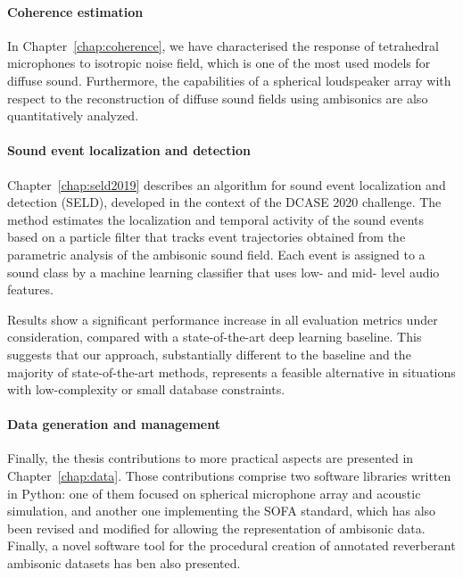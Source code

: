 \paragraph{Coherence estimation}
In Chapter~\ref{chap:coherence}, we have characterised the response of tetrahedral microphones to isotropic noise field, which is one of the most used models for diffuse sound. Furthermore, the capabilities of a spherical loudspeaker array with respect to the reconstruction of diffuse sound fields using ambisonics are also quantitatively analyzed.

\paragraph{Sound event localization and detection}
Chapter~\ref{chap:seld2019} describes an algorithm for sound event localization and detection (SELD), developed in the context of the DCASE 2020 challenge. The method estimates the localization and temporal activity of the sound events based on a particle filter that tracks event trajectories obtained from the parametric analysis of the ambisonic sound field. Each event is assigned to a sound class by a machine learning classifier that uses low- and mid- level audio features. 

Results show a significant performance increase in all evaluation metrics under consideration, compared with a state-of-the-art deep learning baseline.
This suggests that our approach, substantially different to the baseline and the majority of state-of-the-art methods, represents a feasible alternative in situations with low-complexity or small database constraints. 


\paragraph{Data generation and management}
Finally, the thesis contributions to more practical aspects are presented in Chapter~\ref{chap:data}. Those contributions comprise two software libraries written in Python: one of them focused on spherical microphone array and acoustic simulation, and another one implementing the SOFA standard, which has also been revised and modified for allowing the representation of ambisonic data. 
Finally, a novel software tool for the procedural creation of annotated reverberant ambisonic datasets has ben also presented.

